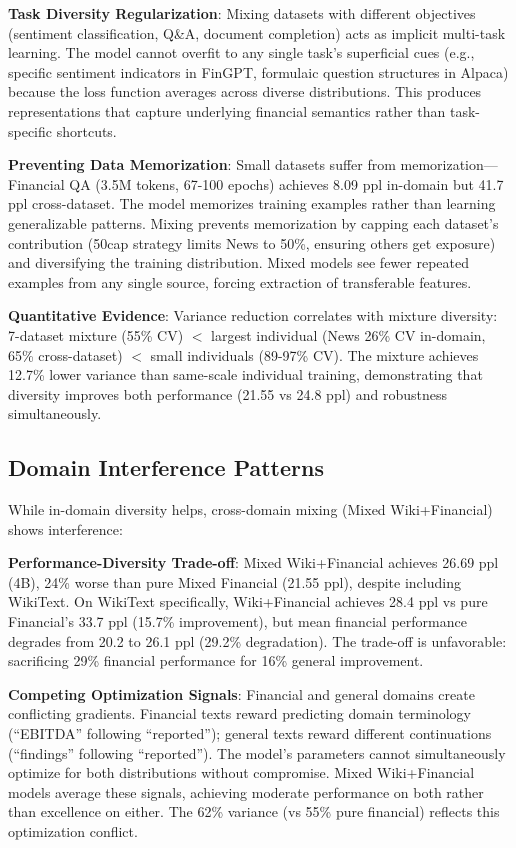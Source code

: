 \textbf{Task Diversity Regularization}: Mixing datasets with different objectives (sentiment classification, Q\&A, document completion) acts as implicit multi-task learning. The model cannot overfit to any single task's superficial cues (e.g., specific sentiment indicators in FinGPT, formulaic question structures in Alpaca) because the loss function averages across diverse distributions. This produces representations that capture underlying financial semantics rather than task-specific shortcuts.

\textbf{Preventing Data Memorization}: Small datasets suffer from memorization—Financial QA (3.5M tokens, 67-100 epochs) achieves 8.09 ppl in-domain but 41.7 ppl cross-dataset. The model memorizes training examples rather than learning generalizable patterns. Mixing prevents memorization by capping each dataset's contribution (50cap strategy limits News to 50\%, ensuring others get exposure) and diversifying the training distribution. Mixed models see fewer repeated examples from any single source, forcing extraction of transferable features.

\textbf{Quantitative Evidence}: Variance reduction correlates with mixture diversity: 7-dataset mixture (55\% CV) $<$ largest individual (News 26\% CV in-domain, 65\% cross-dataset) $<$ small individuals (89-97\% CV). The mixture achieves 12.7\% lower variance than same-scale individual training, demonstrating that diversity improves both performance (21.55 vs 24.8 ppl) and robustness simultaneously.

\subsection{Domain Interference Patterns}

While in-domain diversity helps, cross-domain mixing (Mixed Wiki+Financial) shows interference:

\textbf{Performance-Diversity Trade-off}: Mixed Wiki+Financial achieves 26.69 ppl (4B), 24\% worse than pure Mixed Financial (21.55 ppl), despite including WikiText. On WikiText specifically, Wiki+Financial achieves 28.4 ppl vs pure Financial's 33.7 ppl (15.7\% improvement), but mean financial performance degrades from 20.2 to 26.1 ppl (29.2\% degradation). The trade-off is unfavorable: sacrificing 29\% financial performance for 16\% general improvement.

\textbf{Competing Optimization Signals}: Financial and general domains create conflicting gradients. Financial texts reward predicting domain terminology (``EBITDA'' following ``reported''); general texts reward different continuations (``findings'' following ``reported''). The model's parameters cannot simultaneously optimize for both distributions without compromise. Mixed Wiki+Financial models average these signals, achieving moderate performance on both rather than excellence on either. The 62\% variance (vs 55\% pure financial) reflects this optimization conflict.


